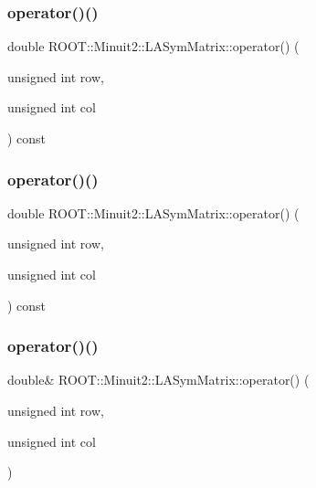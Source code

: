 \subsubsection{\texorpdfstring{operator()()}{operator()()}\hspace{0.1cm}{\footnotesize\ttfamily [1/4]}}
{\footnotesize\ttfamily double R\+O\+O\+T\+::\+Minuit2\+::\+L\+A\+Sym\+Matrix\+::operator() (\begin{DoxyParamCaption}\item[{unsigned int}]{row,  }\item[{unsigned int}]{col }\end{DoxyParamCaption}) const\hspace{0.3cm}{\ttfamily [inline]}}

\mbox{\label{classROOT_1_1Minuit2_1_1LASymMatrix_a3a1a954a9e1ab78f255146ccd76d3847}} 
\subsubsection{\texorpdfstring{operator()()}{operator()()}\hspace{0.1cm}{\footnotesize\ttfamily [2/4]}}
{\footnotesize\ttfamily double R\+O\+O\+T\+::\+Minuit2\+::\+L\+A\+Sym\+Matrix\+::operator() (\begin{DoxyParamCaption}\item[{unsigned int}]{row,  }\item[{unsigned int}]{col }\end{DoxyParamCaption}) const\hspace{0.3cm}{\ttfamily [inline]}}

\mbox{\label{classROOT_1_1Minuit2_1_1LASymMatrix_a580d204fdc526218483e7b2e276da265}} 
\subsubsection{\texorpdfstring{operator()()}{operator()()}\hspace{0.1cm}{\footnotesize\ttfamily [3/4]}}
{\footnotesize\ttfamily double\& R\+O\+O\+T\+::\+Minuit2\+::\+L\+A\+Sym\+Matrix\+::operator() (\begin{DoxyParamCaption}\item[{unsigned int}]{row,  }\item[{unsigned int}]{col }\end{DoxyParamCaption})\hspace{0.3cm}{\ttfamily [inline]}}

